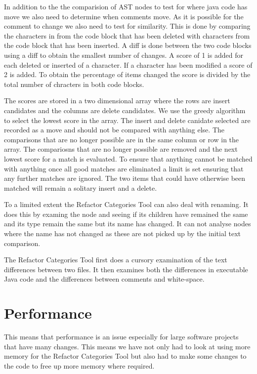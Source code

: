 In addition to the the comparision of AST nodes to test for where java code has move we also need to determine when comments move.  As it is possible for the comment to change we also need to test for similarity.  This is done by comparing the characters in from the code block that has been deleted with characters from the code block that has been inserted.  A diff is done between the two code blocks using a diff to obtain the smallest number of changes. A score of 1 is added for each deleted or inserted of a character.  If a character has been modified a score of 2 is added. To obtain the percentage of items changed the score is divided by the total number of chracters in both code blocks.


The scores are stored in a two dimensional array where the rows are insert candidates and the columns are delete candidates.  We use the greedy algorithm to select the lowest score in the array.  The insert and delete canidate selected are recorded as a move and should not be compared with anything else. The comparisons that are no longer possible are in the same column or row in the array.  The compariosns that are no longer possible are removed and the next lowest score for a match is evaluated.  To ensure that anything cannot be matched with anything once all good matches are eliminated a limit is set ensuring that any further matches are ignored.  The two items that could have otherwise been matched will remain a solitary insert and a delete.

To a limited extent the Refactor Categories Tool can also deal with renaming. It does this by examing the node and seeing if its children have remained the same and its type remain the same but its name has changed. It can not analyse nodes where the name has not changed as these are not picked up by the initial text comparison.

The Refactor Categories Tool first does a cursory examination of the text differences between two files. It then examines both the differences in executable Java code and the differences between comments and white-space. 



\section{Performance}
 This means that performance is an issue especially for large software projects that have many changes. This means we have not only had to look at using more memory for the Refactor Categories Tool but also had to make some changes to the code to free up more memory where required.

